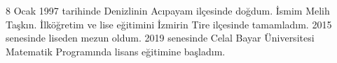 8 Ocak 1997 tarihinde Denizlinin Acıpayam ilçesinde doğdum. İsmim Melih Taşkın. İlköğretim ve lise eğitimini İzmirin Tire ilçesinde tamamladım. 2015 senesinde liseden mezun oldum. 2019 senesinde Celal Bayar Üniversitesi Matematik Programında lisans eğitimine başladım.